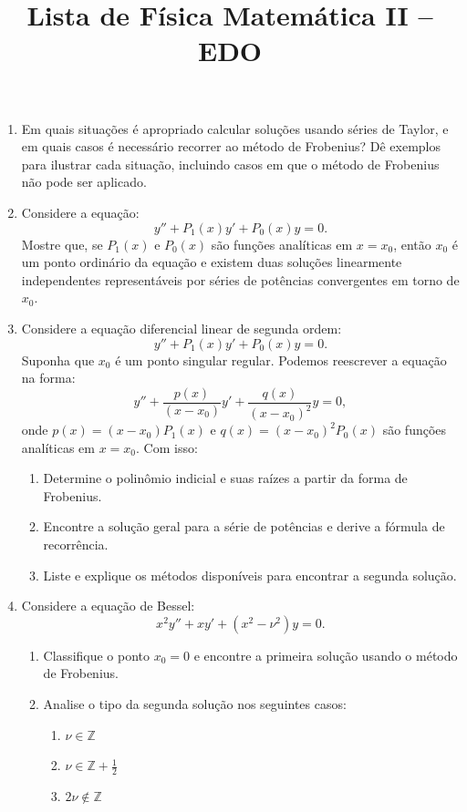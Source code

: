 \newif\ifuseseminar
\useseminartrue


\title{Lista de Física Matemática II -- EDO}


\begin{enumerate}
	\item Em quais situações é apropriado calcular soluções usando séries de Taylor, e em quais casos é necessário recorrer ao método de Frobenius? Dê exemplos para ilustrar cada situação, incluindo casos em que o método de Frobenius não pode ser aplicado.
	\item Considere a equação:
	      $$y'' + P_1(x)y' + P_0(x)y = 0.$$
	      Mostre que, se $P_1(x)$ e $P_0(x)$ são funções analíticas em $x = x_0$, então $x_0$ é um ponto ordinário da equação e existem duas soluções linearmente independentes representáveis por séries de potências convergentes em torno de $x_0$.
	\item Considere a equação diferencial linear de segunda ordem:
	      $$y'' + P_1(x)y' + P_0(x)y = 0.$$
	      Suponha que $x_0$ é um ponto singular regular. Podemos reescrever a equação na forma:
	      $$y'' + \frac{p(x)}{(x - x_0)}y' + \frac{q(x)}{(x - x_0)^2}y = 0,$$
	      onde $p(x) = (x - x_0)P_1(x)$ e $q(x) = (x - x_0)^2P_0(x)$ são funções analíticas em $x = x_0$. Com isso:
	      \begin{enumerate}
		      \item Determine o polinômio indicial e suas raízes a partir da forma de Frobenius.
		      \item Encontre a solução geral para a série de potências e derive a fórmula de recorrência.
		      \item Liste e explique os métodos disponíveis para encontrar a segunda solução.
	      \end{enumerate}

	\item Considere a equação de Bessel:
	      \[x^2y'' + xy' + (x^2 - \nu^2)y = 0.\]
	      \begin{enumerate}
		      \item Classifique o ponto $x_0 = 0$ e encontre a primeira solução usando o método de Frobenius.
		      \item Analise o tipo da segunda solução nos seguintes casos:
		            \begin{enumerate}
			            \item $\nu \in \mathbb{Z}$
			            \item $\nu \in \mathbb{Z} + \tfrac{1}{2}$
			            \item $2\nu \notin \mathbb{Z}$
		            \end{enumerate}
	      \end{enumerate}


\end{enumerate}

